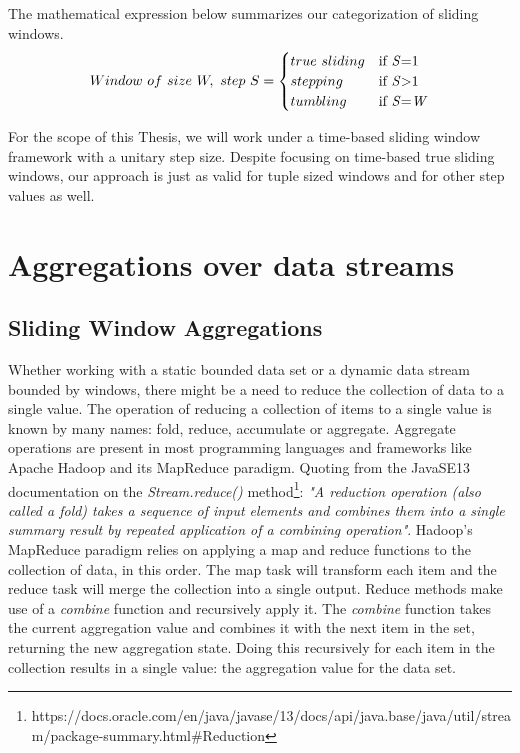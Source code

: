 The mathematical expression below summarizes our categorization of sliding windows.
\begin{equation} 
  Window \,\, of \,\, size \,\, W, \,\, step \,\, S =
    \begin{cases}
      true \,\, sliding & \text{if \textit{S}=1}\\
      stepping & \text{if \textit{S}>1}\\
      tumbling & \text{if \textit{S}=\textit{W}}
    \end{cases}
\end{equation}

For the scope of this Thesis, we will work under a time-based sliding window framework with a unitary step size. Despite focusing on time-based true sliding windows, our approach is just as valid for tuple sized windows and for other step values as well.

\section{Aggregations over data streams} \label{sec:aggregations}

\subsection{Sliding Window Aggregations}

Whether working with a static bounded data set or a dynamic data stream bounded by windows, there might be a need to reduce the collection of data to a single value. The operation of reducing a collection of items to a single value is known by many names: fold, reduce, accumulate or aggregate. Aggregate operations are present in most programming languages and frameworks like Apache Hadoop and its MapReduce paradigm. Quoting from the JavaSE13 documentation on the \textit{Stream.reduce()} method\footnote{https://docs.oracle.com/en/java/javase/13/docs/api/java.base/java/util/stream/package-summary.html\#Reduction}: \textit{"A reduction operation (also called a fold) takes a sequence of input elements and combines them into a single summary result by repeated application of a combining operation"}. Hadoop's MapReduce paradigm relies on applying a map and reduce functions to the collection of data, in this order. The map task will transform each item and the reduce task will merge the collection into a single output. Reduce methods make use of a \textit{combine} function and recursively apply it. The \textit{combine} function takes the current aggregation value and combines it with the next item in the set, returning the new aggregation state. Doing this recursively for each item in the collection results in a single value: the aggregation value for the data set.

